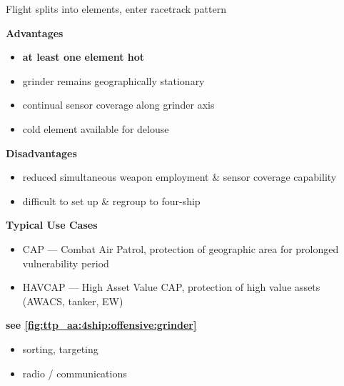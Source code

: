 
\clearpage

\begin{tcoloritemize}
    \blueitem[Grinder]
    Flight splits into elements, enter racetrack pattern

    \bigskip
    \textbf{Advantages}
    \begin{itemize}
        \item \textbf{at least one element hot}
        \item grinder remains geographically stationary
        \item continual sensor coverage along grinder axis
        \item cold element available for delouse
    \end{itemize}

    \textbf{Disadvantages}
    \begin{itemize}
        \item reduced simultaneous weapon employment \& sensor coverage capability
        \item difficult to set up \& regroup to four-ship
    \end{itemize}

    \textbf{Typical Use Cases} 
    \begin{itemize}
        \item CAP --- Combat Air Patrol, protection of geographic area for prolonged vulnerability period
        \item HAVCAP --- High Asset Value CAP, protection of high value assets (AWACS, tanker, EW)
    \end{itemize}
    
    \hfill\textbf{see \cref{fig:ttp_aa:4ship:offensive:grinder}}

    \begin{itemize}
        \item sorting, targeting
        \item radio / communications
    \end{itemize}


\end{tcoloritemize}
